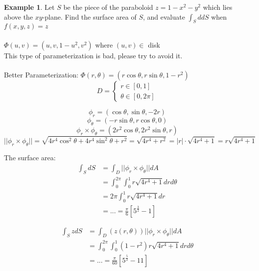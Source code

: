 \documentclass[12pt]{article}
\theoremstyle{plain}
\theoremstyle{definition}
\newtheorem{example}[theorem]{Example}
\begin{document}
\begin{example}
	Let $S$ be the piece of the paraboloid $z=1-x^2 -y^2$ which lies above the $xy$-plane. Find the surface area of $S$, and evaluate $\int_S d dS$ when $f(x,y,z)=z$\\
	\\
	$\Phi (u,v) = (u,v,1-u^2,v^2)$ where $(u,v) \in$ disk\\
	This type of parameterization is bad, please try to avoid it.\\
	\\
	Better Parameterization: $\Phi (r, \theta) = (r\cos\theta, r\sin\theta, 1-r^2)$
	$$D = \begin{cases}
		r \in [0,1]\\
		\theta \in [0,2\pi]
	\end{cases}$$

	$$\phi_r = (\cos\theta, \sin\theta, -2r)$$
	$$\phi_\theta = (-r\sin\theta, r\cos\theta, 0)$$
	$$\phi_r \times \phi_\theta = (2r^2 \cos\theta, 2r^2 \sin\theta, r)$$
	$$||\phi_r \times \phi_\theta|| = \sqrt{4r^4 \cos^2 \theta + 4r^4 \sin^2 \theta + r^2} = \sqrt{4r^4 + r^2} = |r| \cdot \sqrt{4r^4 + 1} = r\sqrt{4r^4 + 1}$$

	The surface area:
	\begin{align*}
		\int_S dS &= \int_D ||\phi_r \times \phi_\theta|| dA\\
		&= \int^{2\pi}_0 \int^1_0 r\sqrt{4r^4 + 1} dr d\theta\\
		&= 2\pi \int^1_0 r\sqrt{4r^4 + 1} dr\\
		&= ... = \frac{\pi}{6} [5^{\frac{3}{2}} - 1]
	\end{align*}

	\begin{align*}
		\int_S z dS &= \int_D (z(r,\theta)) ||\phi_r \times \phi_\theta|| dA\\
		&= \int^{2\pi}_0 \int^1_0 (1-r^2) r\sqrt{4r^4 + 1} dr d\theta\\
		&= ... = \frac{\pi}{60} [5^{\frac{5}{2}} - 11]
	\end{align*}
\end{example}
\end{document}
